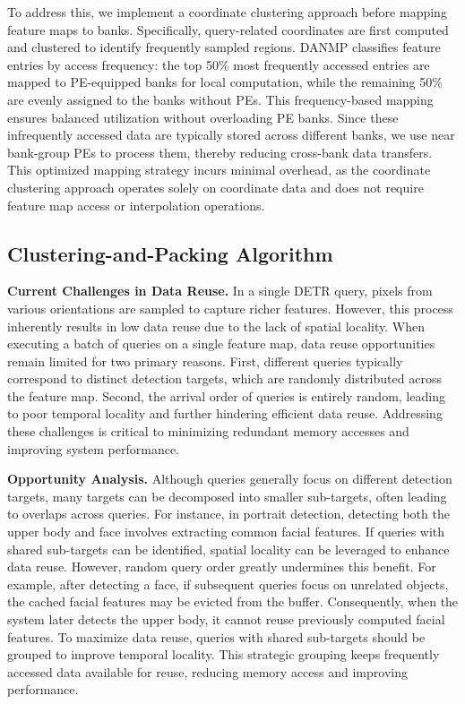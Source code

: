 \documentclass[sigconf]{acmart}
\begin{document}
To address this, we implement a coordinate clustering approach before mapping feature maps to banks. Specifically, query-related coordinates are first computed and clustered to identify frequently sampled regions. {DANMP classifies feature entries by access frequency: the top 50\% most frequently accessed entries are mapped to PE-equipped banks for local computation, while the remaining 50\% are evenly assigned to the banks without PEs.} This frequency-based mapping ensures balanced utilization without overloading PE banks. Since these infrequently accessed data are typically stored across different banks, we use near bank-group PEs to process them, thereby reducing cross-bank data transfers. This optimized mapping strategy incurs minimal overhead, as the coordinate clustering approach operates solely on coordinate data and does not require feature map access or interpolation operations. 


\subsection{Clustering-and-Packing Algorithm}
\label{capa}
\textbf{Current Challenges in Data Reuse.} In a single DETR query, pixels from various orientations are sampled to capture richer features. However, this process inherently results in low data reuse due to the lack of spatial locality. When executing a batch of queries on a single feature map, data reuse opportunities remain limited for two primary reasons. First, different queries typically correspond to distinct detection targets, which are randomly distributed across the feature map. Second, the arrival order of queries is entirely random, leading to poor temporal locality and further hindering efficient data reuse. Addressing these challenges is critical to minimizing redundant memory accesses and improving system performance.


\textbf{Opportunity Analysis.} Although queries generally focus on different detection targets, many targets can be decomposed into smaller sub-targets, often leading to overlaps across queries. For instance, in portrait detection, detecting both the upper body and face involves extracting common facial features. If queries with shared sub-targets can be identified, spatial locality can be leveraged to enhance data reuse. However, random query order greatly undermines this benefit. For example, after detecting a face, if subsequent queries focus on unrelated objects, the cached facial features may be evicted from the buffer. Consequently, when the system later detects the upper body, it cannot reuse previously computed facial features. To maximize data reuse, queries with shared sub-targets should be grouped to improve temporal locality. This strategic grouping keeps frequently accessed data available for reuse, reducing memory access and improving performance.
\end{document}
